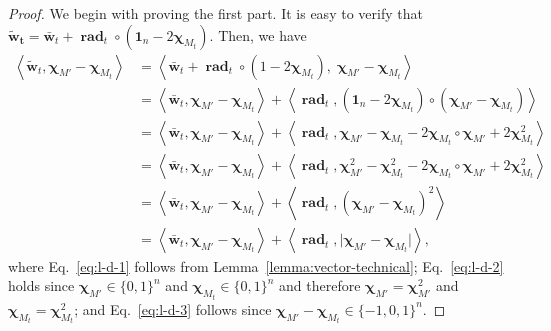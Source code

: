 \documentclass{article}
\newcommand{\junk}[1]{}
\newcommand{\M}{\mathcal M}
\DeclareMathOperator{\rad}{rad}
\DeclareMathOperator*{\argmax}{arg\,max}
\newcommand{\inn}[1]{\left\langle #1 \right\rangle}
\renewcommand{\vec}[1]{\boldsymbol{#1}}
\renewcommand{\odot}{\circ}
\begin{document}
\begin{proof}
We begin with proving the first part.
It is easy to verify that $\vec {\tilde w_t} = \vec {\bar w}_t+ \vec \rad_t \odot (\vec 1_n-2\vec\chi_{M_t})$.
Then, we have
\begin{align}
\inn{\vec{\tilde w}_t, \vec \chi_{M'}-\vec \chi_{M_t}}
&= \inn{\vec {\bar w}_t+ \vec \rad_t \odot (1-2\vec\chi_{M_t}), \;\vec \chi_{M'}-\vec \chi_{M_t}} \nonumber \\
&= \inn{\vec {\bar w}_t,\vec \chi_{M'}-\vec \chi_{M_t}}+\inn{\vec \rad_t, (\vec 1_n-2\vec\chi_{M_t}) \odot (\vec \chi_{M'}-\vec \chi_{M_t})}
\label{eq:l-d-1}\\
&= \inn{\vec {\bar w}_t,\vec \chi_{M'}-\vec \chi_{M_t}}+\inn{\vec \rad_t, \vec\chi_{M'}-\vec\chi_{M_t}-2\vec\chi_{M_t}\odot\vec\chi_{M'}+2\vec\chi_{M_t}^2 } \nonumber\\
&= \inn{\vec {\bar w}_t,\vec \chi_{M'}-\vec \chi_{M_t}}+\inn{\vec \rad_t, \vec\chi_{M'}^2-\vec\chi_{M_t}^2-2\vec\chi_{M_t}\odot\vec\chi_{M'}+2\vec\chi_{M_t}^2 }
\label{eq:l-d-2}\\
&= \inn{\vec {\bar w}_t,\vec \chi_{M'}-\vec \chi_{M_t}}+\inn{\vec \rad_t, (\vec\chi_{M'}-\vec\chi_{M_t})^2}
\nonumber \\ \
&= \inn{\vec {\bar w}_t,\vec \chi_{M'}-\vec \chi_{M_t}}+\inn{\vec \rad_t, \big|\vec\chi_{M'}-\vec\chi_{M_t}\big|},
\label{eq:l-d-3}
\end{align}
where
Eq.~\eqref{eq:l-d-1} follows from Lemma~\ref{lemma:vector-technical};
Eq.~\eqref{eq:l-d-2} holds since $\vec \chi_{M'}\in \{0,1\}^n$ and $\vec \chi_{M_t}\in \{0,1\}^n$
and therefore $\vec\chi_{M'}=\vec\chi_{M'}^2$ and $\vec\chi_{M_t}=\vec\chi_{M_t}^2$;
and Eq.~\eqref{eq:l-d-3} follows since $\vec\chi_{M'}-\vec\chi_{M_t}\in \{-1,0,1\}^n$.
\junk{
Next, recall that $\tilde M_t = \argmax_{M\in \M} \tilde w_t(M)$.
Therefore, we have $\tilde w_t(\tilde M_t) \ge \tilde w_t(M')$.
Subtracting $\tilde w_t(M_t)$ from both sides of the former inequality, we have
\begin{equation}
\tilde w_t(\tilde M_t)-\tilde w_t(M_t) \ge \tilde w_t(M')-\tilde w_t(M_t).
\label{eq:l-d-4}
\end{equation}
The lemma follows by noticing that the left-hand side of Eq.~\eqref{eq:l-d-4} equals to 
$\inn{\vec {\bar w}_t,\vec \chi_{\tilde M_t}-\vec \chi_{M_t}}+\inn{\vec \rad_t, \big|\vec\chi_{\tilde M_t}-\vec\chi_{M_t}\big|}$
and the right-hand side equals to
$\inn{\vec {\bar w}_t,\vec \chi_{M'}-\vec \chi_{M_t}}+\inn{\vec \rad_t, \big|\vec\chi_{M'}-\vec\chi_{M_t}\big|}$.
}
\end{proof}
\end{document}
